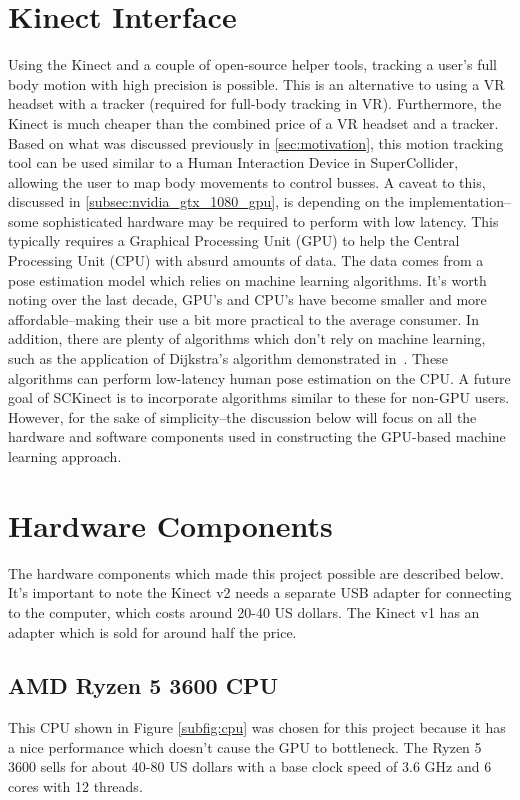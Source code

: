 \documentclass{article}
\begin{document}
\section{Kinect Interface}\label{sec:sckinect}
Using the Kinect and a couple of open-source helper tools, tracking a user's full body motion with high precision is possible. This is an alternative to using a VR headset with a tracker (required for full-body tracking in VR). Furthermore, the Kinect is much cheaper than the combined price of a VR headset and a tracker. Based on what was discussed previously in \ref{sec:motivation}, this motion tracking tool can be used similar to a Human Interaction Device in SuperCollider, allowing the user to map body movements to control busses. A caveat to this, discussed in \ref{subsec:nvidia_gtx_1080_gpu}, is depending on the implementation--some sophisticated hardware may be required to perform with low latency. This typically requires a Graphical Processing Unit (GPU) to help the Central Processing Unit (CPU) with absurd amounts of data. The data comes from a pose estimation model which relies on machine learning algorithms. It's worth noting over the last decade, GPU's and CPU's have become smaller and more affordable--making their use a bit more practical to the average consumer. In addition, there are plenty of algorithms which don't rely on machine learning, such as the application of Dijkstra’s algorithm demonstrated in~\cite{fossati_data-driven_2013}. These algorithms can perform low-latency human pose estimation on the CPU. A future goal of SCKinect is to incorporate algorithms similar to these for non-GPU users. However, for the sake of simplicity--the discussion below will focus on all the hardware and software components used in constructing the GPU-based machine learning approach.
\section{Hardware Components}\label{sec:hardware_components}
The hardware components which made this project possible are described below. It's important to note the Kinect v2 needs a separate USB adapter for connecting to the computer, which costs around 20-40 US dollars. The Kinect v1 has an adapter which is sold for around half the price.
\subsection{AMD Ryzen 5 3600 CPU}\label{subsec:amd_ryzen_5_3600_cpu}
This CPU shown in Figure \ref{subfig:cpu} was chosen for this project because it has a nice performance which doesn't cause the GPU to bottleneck. The Ryzen 5 3600 sells for about 40-80 US dollars with a base clock speed of 3.6 GHz and 6 cores with 12 threads.
\end{document}
